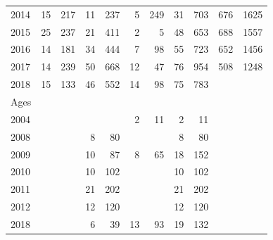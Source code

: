 \documentclass[12pt,]{article}
\begin{document}
\begin{table}[ht]
\begin{tabular}{lrrrrrrrrrr}
  2014 &  15 & 217 &  11 & 237 &   5 & 249 &  31 & 703 & 676 & 1625 \\ 
  2015 &  25 & 237 &  21 & 411 &   2 &   5 &  48 & 653 & 688 & 1557 \\ 
  2016 &  14 & 181 &  34 & 444 &   7 &  98 &  55 & 723 & 652 & 1456 \\ 
  2017 &  14 & 239 &  50 & 668 &  12 &  47 &  76 & 954 & 508 & 1248 \\ 
  2018 &  15 & 133 &  46 & 552 &  14 &  98 &  75 & 783 &  &  \\ 
  Ages &  &  &  &  &  &  &  &  &  &  \\ 
  2004 &  &  &  &  &   2 &  11 &   2 &  11 &  &  \\ 
  2008 &  &  &   8 &  80 &  &  &   8 &  80 &  &  \\ 
  2009 &  &  &  10 &  87 &   8 &  65 &  18 & 152 &  &  \\ 
  2010 &  &  &  10 & 102 &  &  &  10 & 102 &  &  \\ 
  2011 &  &  &  21 & 202 &  &  &  21 & 202 &  &  \\ 
  2012 &  &  &  12 & 120 &  &  &  12 & 120 &  &  \\ 
  2018 &  &  &   6 &  39 &  13 &  93 &  19 & 132 &  &  \\ 
   \hline
  \end{tabular}
\end{table}

\FloatBarrier
\newpage
\end{document}
